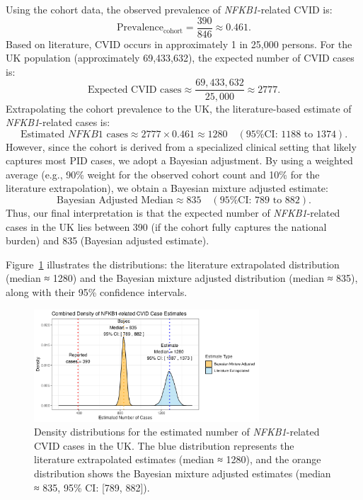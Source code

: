 \documentclass[a4paper,12pt]{article}
\begin{document}
Using the cohort data, the observed prevalence of \textit{NFKB1}-related CVID is:
\[
\text{Prevalence}_{\text{cohort}} = \frac{390}{846} \approx 0.461.
\]
Based on literature, CVID occurs in approximately 1 in 25,000 persons. For the UK population (approximately 69,433,632), the expected number of CVID cases is:
\[
\text{Expected CVID cases} \approx \frac{69,433,632}{25,000} \approx 2777.
\]
Extrapolating the cohort prevalence to the UK, the literature-based estimate of \textit{NFKB1}-related cases is:
\[
\text{Estimated } NFKB1 \text{ cases} \approx 2777 \times 0.461 \approx 1280 \quad (\text{95\% CI: } 1188 \text{ to } 1374).
\]
However, since the cohort is derived from a specialized clinical setting that likely captures most PID cases, we adopt a Bayesian adjustment. By using a weighted average (e.g., 90\% weight for the observed cohort count and 10\% for the literature extrapolation), we obtain a Bayesian mixture adjusted estimate:
\[
\text{Bayesian Adjusted Median} \approx 835 \quad (\text{95\% CI: } 789 \text{ to } 882).
\]
Thus, our final interpretation is that the expected number of \textit{NFKB1}-related cases in the UK lies between 390 (if the cohort fully captures the national burden) and 835 (Bayesian adjusted estimate).

Figure~\ref{fig:nfkb1_case_est_distribution_combined_mixture} illustrates the distributions: the literature extrapolated distribution (median ≈ 1280) and the Bayesian mixture adjusted distribution (median ≈ 835), along with their 95\% confidence intervals.

\begin{figure}[H]
  \centering
  \includegraphics[width=0.75\textwidth]{../images/nfkb1_case_est_distribution_combined_mixture.png}
  \caption{Density distributions for the estimated number of \textit{NFKB1}-related CVID cases in the UK. The blue distribution represents the literature extrapolated estimates (median ≈ 1280), and the orange distribution shows the Bayesian mixture adjusted estimates (median ≈ 835, 95\% CI: [789, 882]).}
  \label{fig:nfkb1_case_est_distribution_combined_mixture}
\end{figure}
\end{document}
